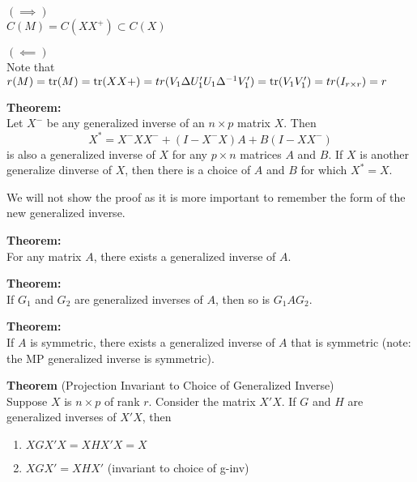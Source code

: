 \documentclass[12pt]{article}
\numberwithin{equation}{section}
\begin{document}
$(\implies)$ \\
$C(M) = C(X X^+) \subset C(X)$

$(\impliedby)$ \\
Note that
$r(M) = \tr(M) = \tr(XX+) = tr(V_1 \Delta U_1' U_1 \Delta^{-1} V_1') = \tr(V_1 V_1') = tr(I_{r \times r}) = r$

\textbf{Theorem:} \\
Let $X^-$ be any generalized inverse of an $n \times p$ matrix $X$. Then
\begin{equation*}
  X^* = X^- X X^- + (I - X^- X)A + B(I - XX^-)
\end{equation*}
is also a generalized inverse of $X$ for any $p \times n$ matrices $A$ and $B$. If $X$ is another generalize dinverse of $X$, then there is a choice of $A$ and $B$ for which $X^* = X$.

We will not show the proof as it is more important to remember the form of the new generalized inverse.

\textbf{Theorem:} \\
For any matrix $A$, there exists a generalized inverse of $A$.

\textbf{Theorem:} \\
If $G_1$ and $G_2$ are generalized inverses of $A$, then so is $G_1 A G_2$.

\textbf{Theorem:} \\
If $A$ is symmetric, there exists a generalized inverse of $A$ that is symmetric (note: the MP generalized inverse is symmetric).

\textbf{Theorem} (Projection Invariant to Choice of Generalized Inverse) \\
Suppose $X$ is $n \times p$ of rank $r$. Consider the matrix $X'X$. If $G$ and $H$ are generalized inverses of $X'X$, then 
\begin{enumerate}
  \item $XGX'X = XHX'X = X$
  \item $XGX' = XHX'$ (invariant to choice of g-inv)
\end{enumerate}
\end{document}
